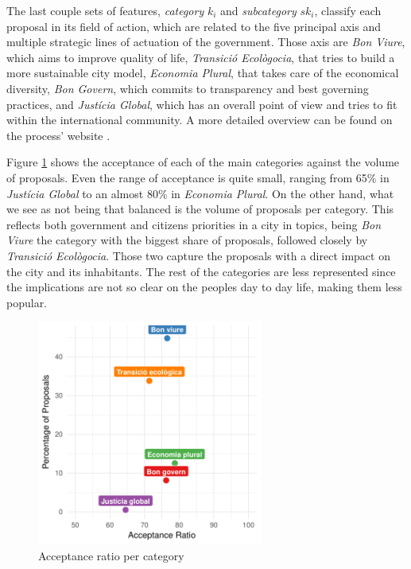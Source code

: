 The last couple sets of features, \emph{category} $k_i$ and \emph{subcategory} $sk_i$, classify each proposal in its field of action, which are related to the five principal axis and multiple  strategic lines of actuation of the government. Those axis are \textit{Bon Viure}, which aims to improve quality of life, \textit{Transici\'o Ecol\`ogocia}, that tries to build a more sustainable city model, \textit{Economia Plural}, that takes care of the economical diversity, \textit{Bon Govern}, which commits to transparency and best governing practices, and \textit{Just\'icia Global}, which has an overall point of view and tries to fit within the international community. A more detailed overview can be found on the process' website \cite{pam}. 


Figure \ref{category} shows the acceptance of each of the main categories against the volume of proposals. Even the range of acceptance is quite small, ranging from 65\% in \textit{Just\'icia Global} to an almost 80\% in \textit{Economia Plural}. On the other hand, what we see as not being that balanced is the volume of proposals per category. This reflects both government and citizens priorities in a city in topics, being \textit{Bon Viure} the category with the biggest share of proposals, followed closely by \textit{Transici\'o Ecol\`ogocia}. Those two capture the proposals with a direct impact on the city and its inhabitants. The rest of the categories are less represented since the implications are not so clear on the peoples day to day life, making them less popular.

\begin{figure}[H]
    \centering
    \includegraphics[width=0.66\textwidth]{Figures/category_1.pdf}
    \caption{Acceptance ratio per category}
    \label{category}
\end{figure}

